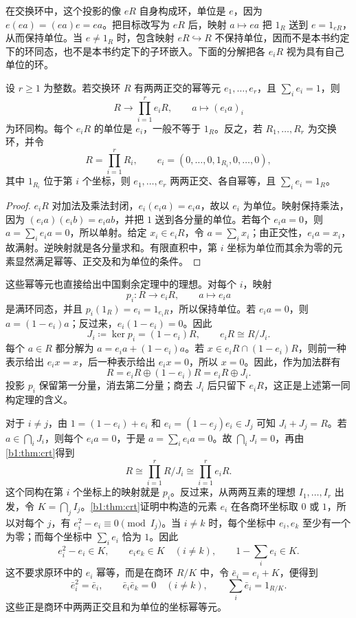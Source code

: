 \ProseParagraphBreak
在交换环中，这个投影的像 \(eR\) 自身构成环，单位是 \(e\)，因为 \(e(ea)=(ea)e=ea\)。把目标改写为 \(eR\) 后，映射 \(a\mapsto ea\) 把 \(1_R\) 送到 \(e=1_{eR}\)，从而保持单位。当 \(e\ne1_R\) 时，包含映射 \(eR\hookrightarrow R\) 不保持单位，因而不是本书约定下的环同态，也不是本书约定下的子环嵌入。下面的分解把各 \(e_iR\) 视为具有自己单位的环。

\begin{proposition}\label{b1:prop:idempotent-product}
	设 \(r\geq1\) 为整数。若交换环 \(R\) 有两两正交的幂等元 \(e_1,\ldots,e_r\)，且 \(\sum_i e_i=1\)，则
	\[
		R\longrightarrow\prod_{i=1}^r e_iR,\qquad a\longmapsto(e_ia)_i
	\]
	为环同构。每个 \(e_iR\) 的单位是 \(e_i\)，一般不等于 \(1_R\)。反之，若 \(R_1,\ldots,R_r\) 为交换环，并令
	\[
		R=\prod_{i=1}^rR_i, \qquad e_i=(0,\ldots,0,1_{R_i},0,\ldots,0),
	\]
	其中 \(1_{R_i}\) 位于第 \(i\) 个坐标，则 \(e_1,\ldots,e_r\) 两两正交、各自幂等，且 \(\sum_i e_i=1_R\)。
\end{proposition}
\begin{proof}
	\(e_iR\) 对加法及乘法封闭，\(e_i(e_ia)=e_ia\)，故以 \(e_i\) 为单位。映射保持乘法，因为 \((e_ia)(e_ib)=e_iab\)，并把 \(1\) 送到各分量的单位。若每个 \(e_ia=0\)，则 \(a=\sum_i e_ia=0\)，所以单射。给定 \(x_i\in e_iR\)，令 \(a=\sum_i x_i\)；由正交性，\(e_ia=x_i\)，故满射。逆映射就是各分量求和。有限直积中，第 \(i\) 坐标为单位而其余为零的元素显然满足幂等、正交及和为单位的条件。
\end{proof}

这些幂等元也直接给出中国剩余定理中的理想。对每个 \(i\)，映射
\[
	p_i:R\longrightarrow e_iR,\qquad a\longmapsto e_i a
\]
是满环同态，并且 \(p_i(1_R)=e_i=1_{e_iR}\)，所以保持单位。若 \(e_i a=0\)，则 \(a=(1-e_i)a\)；反过来，\(e_i(1-e_i)=0\)。因此
\[
	J_i\coloneqq\ker p_i=(1-e_i)R, \qquad e_iR\cong R/J_i.
\]
每个 \(a\in R\) 都分解为 \(a=e_ia+(1-e_i)a\)。若 \(x\in e_iR\cap(1-e_i)R\)，则前一种表示给出 \(e_ix=x\)，后一种表示给出 \(e_ix=0\)，所以 \(x=0\)。因此，作为加法群有
\[
	R=e_iR\oplus(1-e_i)R=e_iR\oplus J_i.
\]
投影 \(p_i\) 保留第一分量，消去第二分量；商去 \(J_i\) 后只留下 \(e_iR\)，这正是上述第一同构定理的含义。

\ProseParagraphBreak
对于 \(i\ne j\)，由 \(1=(1-e_i)+e_i\) 和 \(e_i=(1-e_j)e_i\in J_j\) 可知 \(J_i+J_j=R\)。若 \(a\in\bigcap_iJ_i\)，则每个 \(e_i a=0\)，于是 \(a=\sum_i e_i a=0\)。故 \(\bigcap_iJ_i=0\)，再由\cref{b1:thm:crt}得到
\[
	R\cong\prod_{i=1}^rR/J_i\cong\prod_{i=1}^r e_iR.
\]
这个同构在第 \(i\) 个坐标上的映射就是 \(p_i\)。反过来，从两两互素的理想 \(I_1,\ldots,I_r\) 出发，令 \(K=\bigcap_j I_j\)。\cref{b1:thm:crt}证明中构造的元素 \(e_i\) 在各商环坐标取 \(0\) 或 \(1\)，所以对每个 \(j\)，有 \(e_i^2-e_i\equiv0\pmod{I_j}\)。当 \(i\ne k\) 时，每个坐标中 \(e_i,e_k\) 至少有一个为零；而每个坐标中 \(\sum_i e_i\) 恰为 \(1\)。因此
\[
	e_i^2-e_i\in K,\qquad e_ie_k\in K\quad(i\ne k),\qquad 1-\sum_i e_i\in K.
\]
这不要求原环中的 \(e_i\) 幂等，而是在商环 \(R/K\) 中，令 \(\bar e_i=e_i+K\)，便得到
\[
	\bar e_i^2=\bar e_i,\qquad \bar e_i\bar e_k=0\quad(i\ne k),\qquad \sum_i\bar e_i=1_{R/K}.
\]
这些正是商环中两两正交且和为单位的坐标幂等元。


